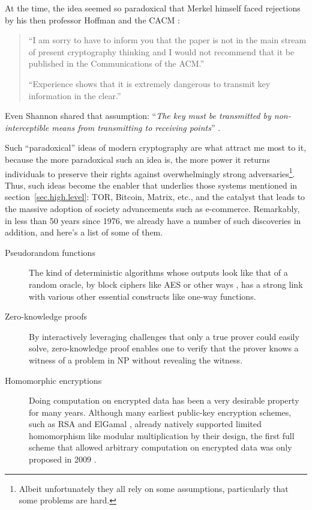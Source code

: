 \documentclass[10pt]{article}
\begin{document}
At the time, the idea seemed so paradoxical that Merkel himself faced 
rejections by his then professor Hoffman and the
CACM \cite{merkle.rejection}:
\begin{quotation}
	``I am sorry to have to inform you that the paper is not in the main stream
	of present cryptography thinking and I would not recommend that it be
	published in the Communications of the ACM.''

	``Experience shows that it is extremely dangerous to transmit key
	information in the clear.''\cite{merkle.rejection}
\end{quotation}
Even Shannon shared that assumption: ``\emph{The key must be transmitted by
non-interceptible means from transmitting to receiving points}''
\cite[p.~670]{shannon.theory.secrecy}.

Such ``paradoxical'' ideas of modern cryptography are what attract me most to
it, because the more paradoxical such an idea is, the more power it returns
individuals to preserve their rights against overwhelmingly strong
adversaries\footnote{Albeit unfortunately they all rely on some assumptions,
particularly that some problems are hard.}.  Thus, such ideas become the
enabler that underlies those systems mentioned in section~\ref{sec.high.level}:
TOR, Bitcoin, Matrix, etc., and the catalyst that leads to the massive adoption
of society advancements such as e-commerce. Remarkably, in less than 50 years
since 1976, we already have a number of such discoveries in addition, and
here's a list of some of them.
\begin{description}
\item[Pseudorandom functions] The kind of deterministic algorithms
	whose outputs look like that of a random oracle, by block ciphers like
	AES\cite{aes} or other ways \cite{pseudo.rand.cons.2}, has a strong link
	with various other essential constructs like one-way functions.

\item[Zero-knowledge proofs] By interactively leveraging challenges that only a
	true prover could easily solve, zero-knowledge proof \cite{zero.knowledge}
	enables one to verify that the prover knows a witness of a problem in NP
	\cite{zero.knowledge.np} without revealing the witness.

\item[Homomorphic encryptions] Doing computation on encrypted data has been a
	very desirable property for many years. Although many earliest public-key
	encryption schemes, such as RSA \cite{rsa} and ElGamal \cite{elgamal},
	already natively supported limited homomorphism like modular
	multiplication by their design, the first full scheme that allowed
	arbitrary computation on encrypted data was only proposed in 2009
	\cite{first.full.homo}.
\end{description}
\end{document}
